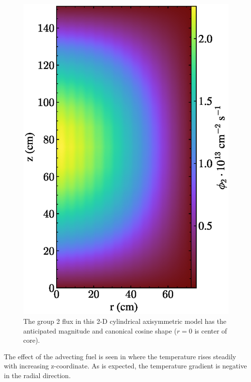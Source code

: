 \documentclass{article}
\begin{document}
\begin{figure}[htpb]
  \centering
  \includegraphics{2d_gamma_heating_group2.eps}
        \caption{The group 2 flux in this 2-D cylindrical axisymmetric model
        has the anticipated magnitude and canonical cosine shape ($r=0$ is center of core). }
  \label{fig:group2}
\end{figure}

The effect of the advecting fuel is seen in  where the temperature
rises steadily with increasing z-coordinate. As is expected, the temperature
gradient is negative in the radial direction.
\end{document}
